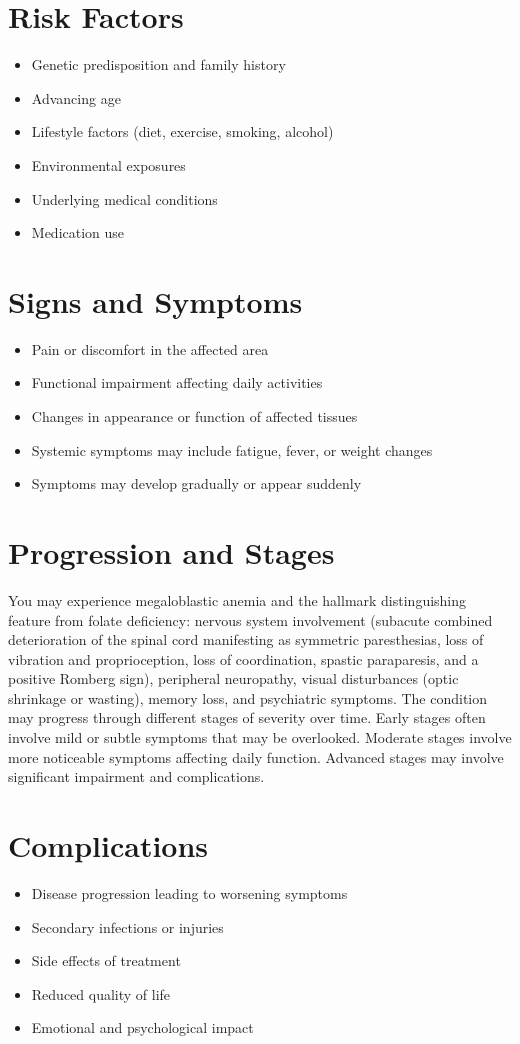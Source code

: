 \section{Risk Factors}
\begin{itemize}[noitemsep]
  \item Genetic predisposition and family history
  \item Advancing age
  \item Lifestyle factors (diet, exercise, smoking, alcohol)
  \item Environmental exposures
  \item Underlying medical conditions
  \item Medication use
\end{itemize}
\section{Signs and Symptoms}
\begin{itemize}[noitemsep]
  \item Pain or discomfort in the affected area
  \item Functional impairment affecting daily activities
  \item Changes in appearance or function of affected tissues
  \item Systemic symptoms may include fatigue, fever, or weight changes
  \item Symptoms may develop gradually or appear suddenly
\end{itemize}
\section{Progression and Stages}
You may experience megaloblastic anemia and the hallmark distinguishing feature from folate deficiency: nervous system involvement (subacute combined deterioration of the spinal cord manifesting as symmetric paresthesias, loss of vibration and proprioception, loss of coordination, spastic paraparesis, and a positive Romberg sign), peripheral neuropathy, visual disturbances (optic shrinkage or wasting), memory loss, and psychiatric symptoms. The condition may progress through different stages of severity over time. Early stages often involve mild or subtle symptoms that may be overlooked. Moderate stages involve more noticeable symptoms affecting daily function. Advanced stages may involve significant impairment and complications.
\section{Complications}
\begin{itemize}[noitemsep]
  \item Disease progression leading to worsening symptoms
  \item Secondary infections or injuries
  \item Side effects of treatment
  \item Reduced quality of life
  \item Emotional and psychological impact
\end{itemize}
